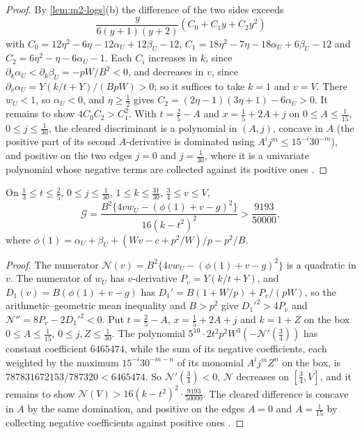 \begin{proof}
By \cref{lem:m2-logs}(b) the difference of the two sides exceeds
\[
\frac{y}{6(y+1)(y+2)}(C_0+C_1y+C_2y^2)
\]
with $C_0=12\eta^2-6\eta-12\alpha_U+12\beta_U-12$,
$C_1=18\eta^2-7\eta-18\alpha_U+6\beta_U-12$ and $C_2=6\eta^2-\eta-6\alpha_U-1$. Each $C_i$ increases
in $k$, since $\partial_k\alpha_U<\partial_k\beta_U=-pW/B^2<0$, and decreases in $v$, since
$\partial_v\alpha_U=Y(k/t+Y)/(BpW)>0$; so it suffices to take $k=1$ and $v=V$. There $w_U<1$, so
$\alpha_U<0$, and $\eta\ge\frac12$ gives $C_2=(2\eta-1)(3\eta+1)-6\alpha_U>0$. It remains to show
$4C_0C_2>C_1^2$. With $t=\frac25-A$ and $x=\frac15+2A+j$ on $0\le A\le\frac1{15}$, $0\le j\le\frac1{30}$, the
cleared discriminant is a polynomial in $(A,j)$, concave in $A$ (the positive part of its second
$A$-derivative is dominated using $A^ij^m\le15^{-i}30^{-m}$), and positive on the two edges $j=0$ and
$j=\frac1{30}$, where it is a univariate polynomial whose negative terms are collected against its
positive ones
\cite[\texttt{MIXED\_\allowbreak NONSHORT\_\allowbreak FORWARD\_\allowbreak Q\_\allowbreak ELIMINATION}]{Notes}.
\end{proof}

\begin{lemma}\label{lem:m2-envelope}
On $\frac13\le t\le\frac25$, $0\le j\le\frac1{30}$, $1\le k\le\frac{31}{30}$, $\frac34\le v\le V$,
\[
\mathcal G=\frac{B^2\{4vw_U-(\phi(1)+v-g)^2\}}{16(k-t^2)^2}>\frac{9193}{50000},
\]
where $\phi(1)=\alpha_U+\beta_U+(Wv-c+p^2/W)/p-p^2/B$.
\end{lemma}

\begin{proof}
The numerator $\mathcal N(v)=B^2\{4vw_U-(\phi(1)+v-g)^2\}$ is a quadratic in $v$. The numerator of
$w_U$ has $v$-derivative $P_v=Y(k/t+Y)$, and $D_1(v)=B(\phi(1)+v-g)$ has $D_1'=B(1+W/p)+P_v/(pW)$,
so the arithmetic--geometric mean inequality and $B>p^2$ give $D_1'^2>4P_v$ and
$\mathcal N''=8P_v-2D_1'^2<0$. Put $t=\frac25-A$, $x=\frac15+2A+j$ and $k=1+Z$ on the box
$0\le A\le\frac1{15}$, $0\le j,Z\le\frac1{30}$. The polynomial $5^{10}\cdot2t^2p^2W^3(-\mathcal N'(\frac34))$
has constant coefficient $6465474$, while the sum of its negative coefficients, each weighted by
the maximum $15^{-i}30^{-m-n}$ of its monomial $A^ij^mZ^n$ on the box, is
$787831672153/787320<6465474$. So $\mathcal N'(\frac34)<0$, $\mathcal N$ decreases on $[\frac34,V]$, and
it remains to show $\mathcal N(V)>16(k-t^2)^2\cdot\frac{9193}{50000}$. The cleared difference is concave
in $A$ by the same domination, and positive on the edges $A=0$ and $A=\frac1{15}$ by collecting
negative coefficients against positive ones
\cite[\texttt{MIXED\_\allowbreak NONSHORT\_\allowbreak FORWARD\_\allowbreak ENVELOPE\_\allowbreak CASIMIR\_\allowbreak SIGN}]{Notes}.
\end{proof}

